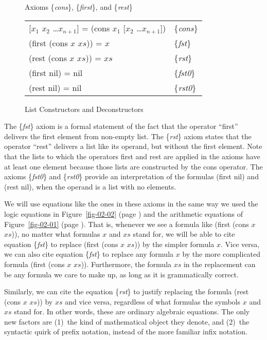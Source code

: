 \begin{figure}
\begin{center}
 Axioms \{\emph{cons}\}, \{\emph{first}\}, and \{\emph{rest}\} \\
\begin{tabular}{ll}
 [$x_1$ $x_2$ \dots $x_{n+1}$] = (cons $x_1$ [$x_2$ \dots $x_{n+1}$]) & \{\emph{cons}\} \\
 (first (cons $x$ $xs$)) = $x$                                        & \{\emph{fst}\}\\
 (rest (cons $x$ $xs$))  = $xs$                                       & \{\emph{rst}\} \\
 (first nil) = nil                                                    & \{\emph{fst0}\}\\
 (rest nil) = nil                                                     & \{\emph{rst0}\}
\end{tabular}
\end{center}
\caption{List Constructors and Deconstructors}
\label{first-rest-cons}
\end{figure}

The \{\emph{fst}\} axiom is a formal statement of the fact that
the operator ``first'' delivers the first element from non-empty list.
The \{\emph{rst}\} axiom states that the operator ``rest'' delivers
a list like its operand, but without the first element.
Note that the lists to which the operators first and rest
are applied in the axioms have at least one element
because those lists are constructed by the cons operator.
The axioms \{\emph{fst0}\} and \{\emph{rst0}\}
provide an interpretation of the formulas (first nil) and (rest nil),
when the operand is a list with no elements.

We will use equations like the ones in these axioms in the
same way we used the logic equations in Figure~\ref{fig-02-02}
(page \pageref{fig-02-02}) and the arithmetic equations of
Figure~\ref{fig-02-01} (page \pageref{fig-02-01}).
That is, whenever we see a formula like (first (cons $x$ $xs$)),
no matter what formulas $x$ and $xs$ stand for,
we will be able to cite equation \{\emph{fst}\} to replace
(first (cons $x$ $xs$)) by the simpler formula $x$.
Vice versa, we can also cite equation \{\emph{fst}\}
to replace any formula $x$ by the more complicated formula
(first (cons $x$ $xs$)).
Furthermore, the formula $xs$ in the replacement can be
any formula we care to make up, as long as it is grammatically correct.

Similarly, we can cite the equation \{\emph{rst}\} to justify
replacing the formula (rest (cons $x$ $xs$)) by $xs$
and vice versa, regardless of what formulas the symbols $x$ and $xs$ stand for.
In other words, these are ordinary algebraic equations.
The only new factors are
(1)~the kind of mathematical object they denote, and
(2)~the syntactic quirk of prefix notation, instead of the more familiar infix notation.

